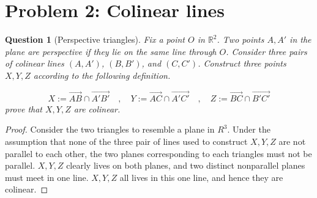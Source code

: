\documentclass{article}
\newtheorem{question}{Question}
\begin{document}
\section{Problem 2: Colinear lines}

\begin{question}[Perspective triangles]
    Fix a point $O$ in $\mathbb R^2$. Two points $A, A'$ in the plane 
    are perspective if they lie on the same line through $O$. 
    Consider three pairs of colinear lines $(A, A')$, $(B, B')$, and $(C, C')$. 
    Construct three points $X, Y, Z$ according to the following definition. 

    \[
X := \overrightarrow{AB} \cap \overrightarrow{A'B'} \quad, \quad
Y := \overrightarrow{AC} \cap \overrightarrow{A'C'} \quad, \quad
Z := \overrightarrow{BC} \cap \overrightarrow{B'C'}
\]
prove that $X, Y, Z$ are colinear. 

\end{question}
\begin{proof}
    Consider the two triangles to resemble a plane in $R^3$. Under 
    the assumption that none of the three pair of lines used to 
    construct $X, Y, Z$ are not parallel to each other, the two planes 
    corresponding to each triangles must not be parallel. 
    $X, Y, Z$ clearly lives on both planes, and two distinct nonparallel 
    planes must meet in one line. $X, Y, Z$ all lives in this one line, 
    and hence they are colinear. 
\end{proof}
\end{document}

